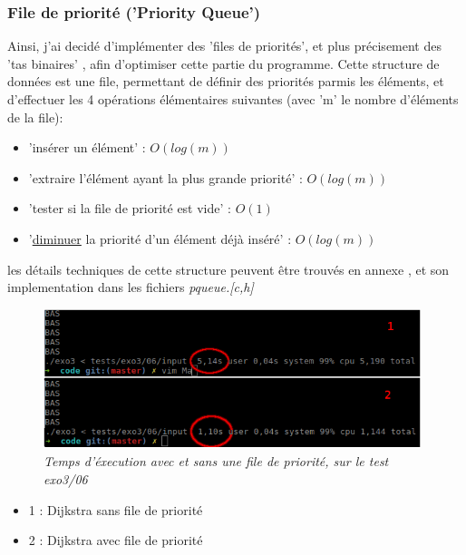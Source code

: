 \documentclass[10pt]{article}
\begin{document}
			\subsubsection{File de priorité ('Priority Queue')}

				Ainsi, j'ai decidé d'implémenter des 'files de priorités', et plus précisement des
				'tas binaires' \cite{binary_heap}, afin d'optimiser cette partie du programme.
				Cette structure de données est une file, permettant de définir des priorités parmis les éléments,
				et d'effectuer les 4 opérations élémentaires suivantes (avec 'm' le nombre d'éléments de la file):
				\begin{itemize}[label=-]
					\item 'insérer un élément' : \(O(log(m))\)
					\item 'extraire l'élément ayant la plus grande priorité' : \({O(log(m))}\)
					\item 'tester si la file de priorité est vide' : \(O(1)\)
					\item '\underline{diminuer} la priorité d'un élément déjà inséré' : \(O(log(m))\)
				\end{itemize}
				les détails techniques de cette structure peuvent être trouvés en annexe \cite{binary_heap},
				et son implementation dans les fichiers \textit{pqueue.[c,h]}

				\begin{figure}[H]
					\begin{center}
						\includegraphics[width=11cm,height=\textheight,keepaspectratio]{./images/performances.png}
					\end{center}
					\caption{\textit{Temps d'éxecution avec et sans une file de priorité, sur le test exo3/06}}
				\end{figure}
				
				\begin{itemize}[label=-]
					\setlength\itemsep{0.1em}
					\item 1 : Dijkstra sans file de priorité
					\item 2 : Dijkstra avec file de priorité
				\end{itemize}
\end{document}
